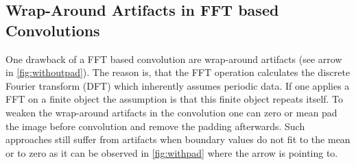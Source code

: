 \documentclass{juliacon}
\begin{document}
\subsection{Wrap-Around Artifacts in FFT based Convolutions}
    One drawback of a FFT based convolution are wrap-around artifacts (see arrow in \autoref{fig:withoutpad}). The reason is, that the FFT operation calculates the discrete
    Fourier transform (DFT) which inherently assumes periodic data. If one applies a FFT on a finite object the assumption is that
    this finite object repeats itself. 
    To weaken the wrap-around artifacts in the convolution one can zero or mean pad the image before convolution 
    and remove the padding afterwards. Such approaches still suffer from artifacts when boundary values do not fit
    to the mean or to zero as it can be observed in \autoref{fig:withpad} where the arrow is pointing to.
\end{document}
